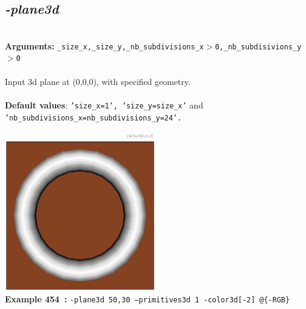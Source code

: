 \documentclass[a4paper,11pt,twoside]{book}
\begin{document}
\subsection{\emph{-plane3d} }\vspace*{-0.5em}
~\\\textbf{Arguments: } 
{\small \texttt{\_size\_x,\_size\_y,\_nb\_subdivisions\_x$>$0,\_nb\_subdisivions\_y$>$0}}\\~\\
Input 3d plane at (0,0,0), with specified geometry.
~\\~\\\textbf{Default values}: {\small \texttt{'size\_x=1', 'size\_y=size\_x'} and \texttt{'nb\_subdivisions\_x=nb\_subdivisions\_y=24'.}}
\begin{center}\includegraphics[keepaspectratio=true,height=7cm,width=\textwidth]{img/gmic_def454.jpg}\\
{\footnotesize \textbf{Example 454~:} \texttt{-plane3d 50,30 --primitives3d 1 -color3d[-2] @\{-RGB\}}}
\end{center}
\end{document}
